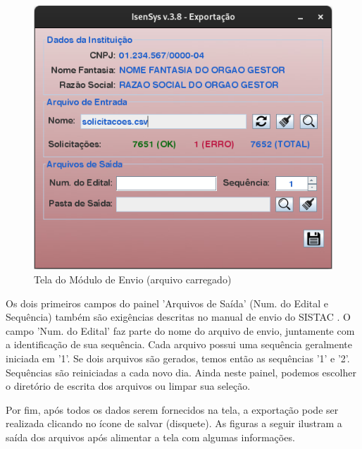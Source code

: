 \documentclass[
	12pt,			%
	openright,		%
	oneside,	
	a4paper,		%
	english,		%
	brazil			%
]{abntex2/abntex2}  %
\begin{document}
				\begin{figure}[h]
					\begin{center}
						
						\caption{Tela do Módulo de Envio (arquivo carregado)}
						\label{envio-ui-loaded}
						
						\includegraphics[scale=0.5]{img/envio-ui-loaded}
						
					\end{center}
				\end{figure}
	
				Os dois primeiros campos do painel 'Arquivos de Saída' (Num. do Edital e Sequência) também são exigências descritas no manual de envio do SISTAC \cite{sistac-formatos}. O campo 'Num. do Edital' faz parte do nome do arquivo de envio, juntamente com a identificação de sua sequência. Cada arquivo possui uma sequência geralmente iniciada em '1'. Se dois arquivos são gerados, temos então as sequências '1' e '2'. Sequências são reiniciadas a cada novo dia. Ainda neste painel, podemos escolher o diretório de escrita dos arquivos ou limpar sua seleção.

				Por fim, após todos os dados serem fornecidos na tela, a exportação pode ser realizada clicando no ícone de salvar (disquete). As figuras a seguir ilustram a saída dos arquivos após alimentar a tela com algumas informações.
\end{document}
